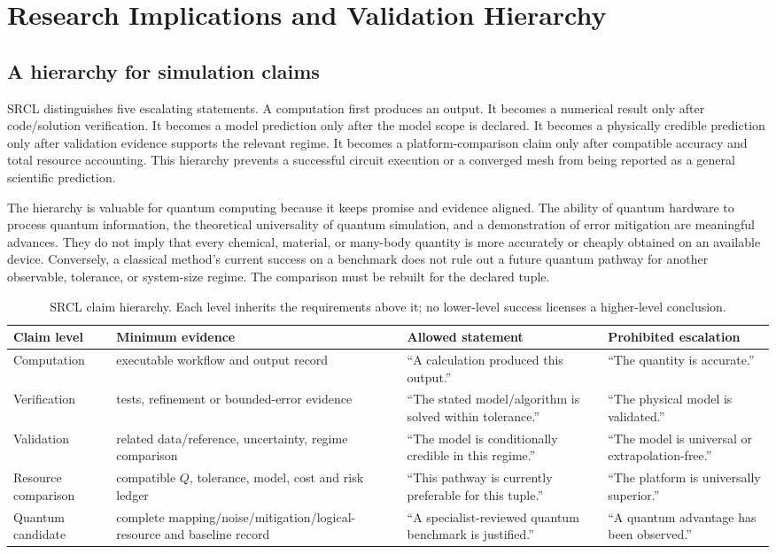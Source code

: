 \documentclass[conference]{../../../../Conference-LaTeX-template_10-17-19/IEEEtran}
\begin{document}
\section{Research Implications and Validation Hierarchy}
\subsection{A hierarchy for simulation claims}
SRCL distinguishes five escalating statements. A computation first produces an output. It becomes a numerical result only after code/solution verification. It becomes a model prediction only after the model scope is declared. It becomes a physically credible prediction only after validation evidence supports the relevant regime. It becomes a platform-comparison claim only after compatible accuracy and total resource accounting. This hierarchy prevents a successful circuit execution or a converged mesh from being reported as a general scientific prediction.

The hierarchy is valuable for quantum computing because it keeps promise and evidence aligned. The ability of quantum hardware to process quantum information, the theoretical universality of quantum simulation, and a demonstration of error mitigation are meaningful advances. They do not imply that every chemical, material, or many-body quantity is more accurately or cheaply obtained on an available device. Conversely, a classical method’s current success on a benchmark does not rule out a future quantum pathway for another observable, tolerance, or system-size regime. The comparison must be rebuilt for the declared tuple.

\begin{table}[!t]
\caption{SRCL claim hierarchy. Each level inherits the requirements above it; no lower-level success licenses a higher-level conclusion.}
\label{tab:hierarchy}
\centering
\small
\begin{tabularx}{\textwidth}{lYYY}
\toprule
Claim level & Minimum evidence & Allowed statement & Prohibited escalation \\
\midrule
Computation & executable workflow and output record & ``A calculation produced this output.'' & ``The quantity is accurate.'' \\
Verification & tests, refinement or bounded-error evidence & ``The stated model/algorithm is solved within tolerance.'' & ``The physical model is validated.'' \\
Validation & related data/reference, uncertainty, regime comparison & ``The model is conditionally credible in this regime.'' & ``The model is universal or extrapolation-free.'' \\
Resource comparison & compatible $Q$, tolerance, model, cost and risk ledger & ``This pathway is currently preferable for this tuple.'' & ``The platform is universally superior.'' \\
Quantum candidate & complete mapping/noise/mitigation/logical-resource and baseline record & ``A specialist-reviewed quantum benchmark is justified.'' & ``A quantum advantage has been observed.'' \\
\bottomrule
\end{tabularx}
\end{table}
\end{document}
